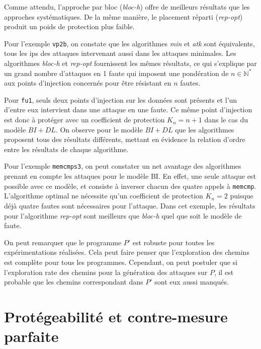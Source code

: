             Comme attendu, l'approche par bloc (\textit{bloc-h}) offre de meilleurs résultats que les approches systématiques. De la même manière, le placement réparti (\textit{rep-opt}) produit un poids de protection plus faible.
            
            Pour l'exemple \texttt{vp2b}, on constate que les algorithmes \textit{min} et \textit{atk} sont équivalents, tous les \gls{ip}s des attaques intervenant aussi dans les attaques minimales.
            Les algorithmes \textit{bloc-h} et \textit{rep-opt} fournissent les mêmes résultats, ce qui s'explique par un grand nombre d'attaques en 1 faute qui imposent une pondération de $n \in \mathbb{N}^*$ aux points d'injection concernés pour être résistant en $n$ fautes.

            Pour \texttt{fu1}, seuls deux points d'injection sur les données sont présents et l'un d'entre eux intervient dans une attaque en une faute. Ce même point d'injection est donc à protéger avec un coefficient de protection $K_n = n + 1$ dans le cas du modèle $BI + DL$.
            On observe pour le modèle $BI + DL$ que les algorithmes proposent tous des résultats différents, mettant en évidence la relation d'ordre entre les résultats de chaque algorithme. 

            Pour l'exemple \texttt{memcmps3}, on peut constater un net avantage des algorithmes prenant en compte les attaques pour le modèle \gls{BI}. En effet, une seule attaque est possible avec ce modèle, et consiste à inverser chacun des quatre appels à \texttt{memcmp}. 
            L'algorithme optimal ne nécessite qu'un coefficient de protection $K_n = 2$ puisque déjà quatre fautes sont nécessaires pour l'attaque. 
            Dans cet exemple, les résultats pour l'algorithme \textit{rep-opt} sont meilleurs que \textit{bloc-h} quel que soit le modèle de faute.
            
            On peut remarquer que le programme $P'$ est robuste pour toutes les expérimentations réalisées. Cela peut faire penser que l'exploration des chemins est complète pour tous les programmes.
            Cependant, on peut postuler que si l'exploration rate des chemins pour la génération des attaques sur $P$, il est probable que les chemins correspondant dans $P'$ sont eux aussi manqués.

    \section{Protégeabilité et contre-mesure parfaite}
    \label{sec:model-protectability}

